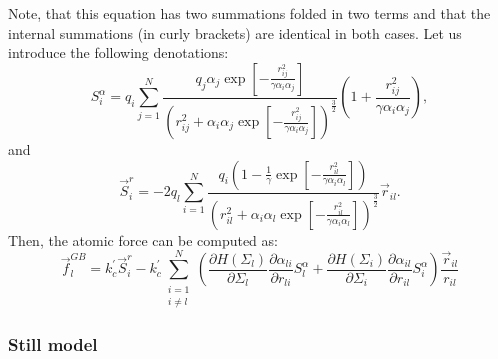 \documentclass[11pt]{book}
\begin{document}
Note, that this equation has two summations folded in two terms and that the internal summations (in curly brackets) are identical in both cases. Let us introduce the following denotations:
\begin{equation}\label{eq:gb-Salphai}
S^{\alpha}_{i}=q_{i}\sum_{j=1}^{N}\frac{q_{j}\alpha_{j}\exp{\left[-\frac{r_{ij}^{2}}{\gamma\alpha_{i}\alpha_{j}}\right]}}{\left(r_{ij}^{2}+\alpha_{i}\alpha_{j}\exp{\left[-\frac{r_{ij}^{2}}{\gamma\alpha_{i}\alpha_{j}}\right]}\right)^{\frac{3}{2}}}\left(1+\frac{r_{ij}^{2}}{\gamma\alpha_{i}\alpha_{j}}\right),
\end{equation}
and 
\begin{equation}\label{eq:gb-Sri}
\vec{S}^{r}_{i}=-2q_{l}\sum_{i=1}^{N}\frac{q_{i}\left(1-\frac{1}{\gamma}\exp{\left[-\frac{r_{il}^{2}}{\gamma\alpha_{i}\alpha_{l}}\right]}\right)}{\left(r_{il}^{2}+\alpha_{i}\alpha_{l}\exp{\left[-\frac{r_{il}^{2}}{\gamma\alpha_{i}\alpha_{l}}\right]}\right)^{\frac{3}{2}}}\vec{r}_{il}.
\end{equation}
Then, the atomic force can be computed as:
\begin{equation}\label{eq:gb-f-2}
\vec{f}_{l}^{GB}=k_{c}^{\prime}\vec{S}^{r}_{i}-k_{c}^{\prime}\sum_{\substack{i=1\\i\ne l}}^{N}\left(\frac{\partial H(\Sigma_{l})}{\partial \Sigma_{l}}\frac{\partial \alpha_{li}}{\partial r_{li}}S^{\alpha}_{l}+\frac{\partial H(\Sigma_{i})}{\partial \Sigma_{i}}\frac{\partial \alpha_{il}}{\partial r_{il}}S^{\alpha}_{i}\right)\frac{\vec{r}_{il}}{r_{il}}
\end{equation}


\subsubsection{Still model}
\end{document}
